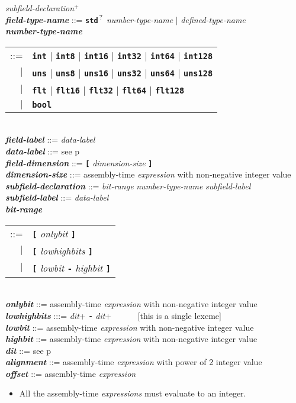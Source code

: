 \documentclass[12pt]{article}
\newcommand{\TT}[1]{{\tt \bfseries #1}}
\newcommand{\PLUS}[1][]{{$^{+#1}$}}
\newcommand{\QMARK}{{$^{\,\mbox{\footnotesize ?}}$}}
\newcommand{\ttkey}[1]{{\tt \bfseries #1}}
\newcommand{\emkey}[1]{{\em \bfseries #1}}
\newcommand{\pagref}[1]{p\pageref{#1}}
\newenvironment{indpar}[1][0.3in]%
	{\begin{list}{}%
		     {\setlength{\itemsep}{0in}%
		      \setlength{\topsep}{0in}%
		      \setlength{\parsep}{1ex}%
		      \setlength{\labelwidth}{#1}%
		      \setlength{\leftmargin}{#1}%
		      \addtolength{\leftmargin}{\labelsep}}%
	 \item}%
	{\end{list}}
\begin{document}
\begin{indpar}
\hspace*{0.5in}
    {\em subfield-declaration}\PLUS{}
\\[2ex]
\emkey{field-type-name} ::= \TT{std}\QMARK{} {\em number-type-name}
                        $|$ {\em defined-type-name} \\
\emkey{number-type-name}
    \begin{tabular}[t]{@{}rl}
    ::= &  \ttkey{int} $|$ \ttkey{int8} $|$ \ttkey{int16} $|$ \ttkey{int32}
                       $|$ \ttkey{int64} $|$ \ttkey{int128} \\
    $|$ &  \ttkey{uns} $|$ \ttkey{uns8} $|$ \ttkey{uns16} $|$ \ttkey{uns32}
                       $|$ \ttkey{uns64} $|$ \ttkey{uns128} \\
    $|$ &  \ttkey{flt} $|$ \ttkey{flt16} $|$ \ttkey{flt32} $|$ \ttkey{flt64}
                         $|$ \ttkey{flt128} \\
    $|$ &  \ttkey{bool}
    \end{tabular}
\\[2ex]
\emkey{field-label} ::=  {\em data-label} \\
\emkey{data-label} ::=  see \pagref{DATA-LABEL}
\\[2ex]
\emkey{field-dimension} ::=  \TT{[} {\em dimension-size} \TT{]} \\
\emkey{dimension-size} ::=  assembly-time {\em expression}
			    with non-negative integer value
\\[2ex]
\emkey{subfield-declaration}
    ::= {\em bit-range} {\em number-type-name} {\em subfield-label} \\
\emkey{subfield-label} ::=  {\em data-label}
\\[2ex]
\emkey{bit-range}
    \begin{tabular}[t]{@{}rl}
    ::= &  \TT{[} {\em onlybit} \TT{]} \\
    $|$ &  \TT{[} {\em lowhighbits} \TT{]} \\
    $|$ &  \TT{[} {\em lowbit} \TT{-} {\em highbit} \TT{]}
    \end{tabular} \\
\emkey{onlybit} ::= assembly-time {\em expression}
		    with non-negative integer value \\
\emkey{lowhighbits} :::= {\em dit}+ \TT{-} {\em dit}+
           ~~~~~ [this is a single lexeme] \\
\emkey{lowbit} ::= assembly-time {\em expression}
		   with non-negative integer value \\
\emkey{highbit} ::= assembly-time {\em expression}
		    with non-negative integer value \\
\emkey{dit} ::= see \pagref{DIT}
\\[2ex]
\emkey{alignment} ::= assembly-time {\em expression}
		      with power of 2 integer value \\
\emkey{offset} ::= assembly-time {\em expression}

\begin{itemize}
\item All the assembly-time {\em expressions} must evaluate to an integer.
\end{itemize}
\end{indpar}
\end{document}
